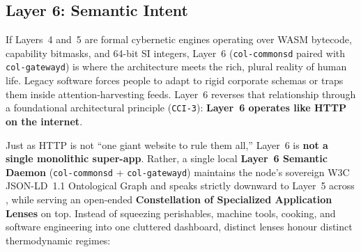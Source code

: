 \subsection{Layer 6: Semantic Intent}

If Layers~4 and~5 are formal cybernetic engines operating over WASM bytecode, capability bitmasks, and 64-bit SI integers, Layer~6 (\texttt{col-commonsd} paired with \texttt{col-gatewayd}) is where the architecture meets the rich, plural reality of human life. Legacy software forces people to adapt to rigid corporate schemas or traps them inside attention-harvesting feeds. Layer~6 reverses that relationship through a foundational architectural principle (\texttt{CCI-3}): \textbf{Layer~6 operates like HTTP on the internet}.

Just as HTTP is not ``one giant website to rule them all,'' Layer~6 is \textbf{not a single monolithic super-app}. Rather, a single local \textbf{Layer~6 Semantic Daemon} (\texttt{col-commonsd} + \texttt{col-gatewayd}) maintains the node's sovereign W3C JSON-LD~1.1 Ontological Graph and speaks strictly downward to Layer~5 across , while serving an open-ended \textbf{Constellation of Specialized Application Lenses} on top. Instead of squeezing perishables, machine tools, cooking, and software engineering into one cluttered dashboard, distinct lenses honour distinct thermodynamic regimes:
